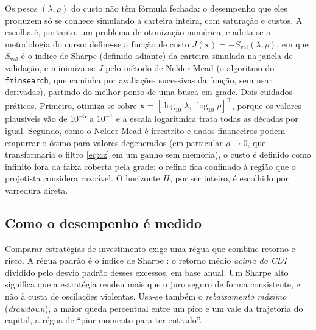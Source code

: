 \documentclass[conference]{IEEEtran}
\begin{document}
Os pesos $(\lambda,\rho)$ do custo não têm fórmula fechada: o desempenho que eles produzem só se conhece simulando a carteira inteira, com saturação e custos. A escolha é, portanto, um problema de otimização numérica, e adota-se a metodologia do curso: define-se a função de custo $J(\mathbf{x}) = -S_{\mathrm{val}}(\lambda,\rho)$, em que $S_{\mathrm{val}}$ é o índice de Sharpe (definido adiante) da carteira simulada na janela de validação, e minimiza-se $J$ pelo método de Nelder-Mead \cite{nelder1965} (o algoritmo do \texttt{fminsearch}, que caminha por avaliações sucessivas da função, sem usar derivadas), partindo do melhor ponto de uma busca em grade. Dois cuidados práticos. Primeiro, otimiza-se sobre $\mathbf{x} = [\log_{10}\lambda,\ \log_{10}\rho]^{\top}$, porque os valores plausíveis vão de $10^{-5}$ a $10^{-1}$ e a escala logarítmica trata todas as décadas por igual. Segundo, como o Nelder-Mead é irrestrito e dados financeiros podem empurrar o ótimo para valores degenerados (em particular $\rho \to 0$, que transformaria o filtro \eqref{eq:cz} em um ganho sem memória), o custo é definido como infinito fora da faixa coberta pela grade: o refino fica confinado à região que o projetista considera razoável. O horizonte $H$, por ser inteiro, é escolhido por varredura direta.

\subsection{Como o desempenho é medido}

Comparar estratégias de investimento exige uma régua que combine retorno e risco. A régua padrão é o índice de Sharpe \cite{sharpe1994}: o retorno médio \emph{acima do CDI} dividido pelo desvio padrão desses excessos, em base anual. Um Sharpe alto significa que a estratégia rendeu mais que o juro seguro de forma consistente, e não à custa de oscilações violentas. Usa-se também o \emph{rebaixamento máximo} (\emph{drawdown}), a maior queda percentual entre um pico e um vale da trajetória do capital, a régua de ``pior momento para ter entrado''.
\end{document}
